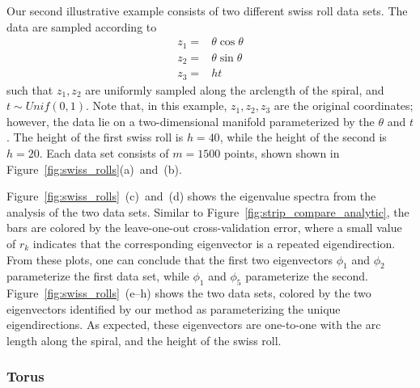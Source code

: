 \documentclass[preprint]{elsarticle}
\begin{document}
Our second illustrative example consists of two different swiss roll data sets.
%
The data are sampled according to
\begin{equation}
\begin{aligned}
z_1 =& \theta \cos \theta \\
z_2 =& \theta \sin \theta \\
z_3 =& h t
\end{aligned}
\end{equation}
%
such that $z_1, z_2$ are uniformly sampled along the arclength of the spiral, and $t \sim Unif(0,1)$. 
%
Note that, in this example, $z_1, z_2, z_3$ are the original coordinates; however, the data lie on a two-dimensional manifold parameterized by the $\theta$ and $t$. 
%
The height of the first swiss roll is $h = 40$, while the height of the second is $h = 20$. 
%
Each data set consists of $m=1500$ points, shown shown in Figure~\ref{fig:swiss_rolls}(a)~and~(b).
%

Figure~\ref{fig:swiss_rolls}~(c)~and~(d) shows the eigenvalue spectra from the analysis of the two data sets.
%
Similar to Figure~\ref{fig:strip_compare_analytic}, the bars are colored by the leave-one-out cross-validation error, where a small value of $r_k$ indicates that the corresponding eigenvector is a repeated eigendirection. 
%
From these plots, one can conclude that the first two eigenvectors $\phi_1$ and $\phi_2$ parameterize the first data set, while $\phi_1$ and $\phi_5$ parameterize the second. 
%
Figure~\ref{fig:swiss_rolls}~(e--h) shows the two data sets, colored by the two eigenvectors identified by our method as parameterizing the unique eigendirections. 
%
As expected, these eigenvectors are one-to-one with the arc length along the spiral, and the height of the swiss roll. 

\subsubsection{Torus}
\end{document}
